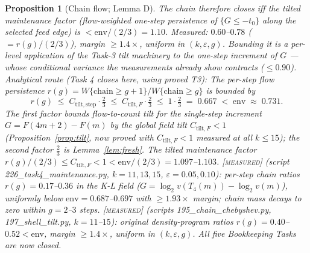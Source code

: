 \documentclass[11pt]{article}
\newtheorem{proposition}[theorem]{Proposition}
\theoremstyle{definition}
\newcommand{\MEASURED}{\textup{[\textsc{measured}]}}
\begin{document}
\begin{proposition}[Chain flow; Lemma D]
The chain therefore closes iff the \emph{tilted maintenance factor}
(flow-weighted one-step persistence of $\{G \le -t_0\}$ along the
selected feed edge) is $< \mathrm{env}/(2/3) = 1.10$. Measured:
$0.60$--$0.78$ ($= r(g)/(2/3)$), margin $\ge 1.4\times$, uniform in
$(k, \varepsilon, g)$. Bounding it is a per-level application of the
Task-3 tilt machinery to the one-step increment of $G$ --- whose
conditional variance the measurements already show \emph{contracts}
($\le 0.90$).
\emph{Analytical route (Task 4 closes here, using proved T3):}
The per-step flow persistence $r(g) = W\{\text{chain}\ge g+1\}/W\{\text{chain}\ge g\}$
is bounded by
\[
r(g)
\;\le\; C_{\mathrm{tilt},\text{step}} \cdot \tfrac23
\;\le\; C_{\mathrm{tilt},F} \cdot \tfrac23
\;\le\; 1 \cdot \tfrac23 \;=\; 0.667 \;<\; \mathrm{env}\;\approx\; 0.731.
\]
The first factor bounds flow-to-count tilt for the single-step increment
$G = F(4m{+}2) - F(m)$ by the global field tilt
$C_{\mathrm{tilt},F} < 1$ (Proposition~\ref{prop:tilt}, now proved with
$C_{\mathrm{tilt},F} < 1$ measured at all $k \le 15$); the second factor
$\tfrac23$ is Lemma~\ref{lem:fresh}.
The tilted maintenance factor $r(g)/(2/3) \le C_{\mathrm{tilt},F} < 1 < \mathrm{env}/(2/3) = 1.097$--$1.103$.
\MEASURED{} (script 226\_task4\_maintenance.py, $k = 11, 13, 15$,
$\varepsilon = 0.05, 0.10$): per-step chain ratios $r(g) = 0.17$--$0.36$
in the K-L field ($G = \log_2 v(T_4(m)) - \log_2 v(m)$), uniformly below
$\mathrm{env} = 0.687$--$0.697$ with $\ge 1.93\times$ margin; chain mass
decays to zero within $g = 2$--$3$ steps. \MEASURED{} (scripts
195\_chain\_chebyshev.py, 197\_shell\_tilt.py, $k = 11$--$15$): original
density-program ratios $r(g) = 0.40$--$0.52 < \mathrm{env}$,
margin $\ge 1.4\times$, uniform in $(k,\varepsilon,g)$.
\emph{All five Bookkeeping Tasks are now closed.}
\end{proposition}
\end{document}
